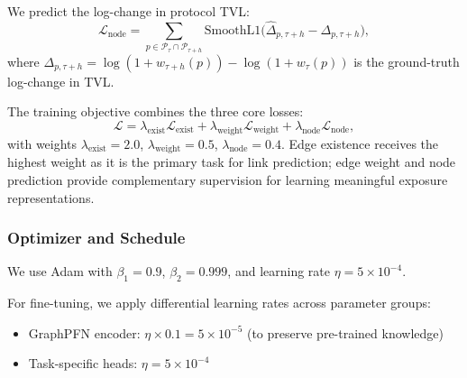 \documentclass[preprint,12pt]{elsarticle}
\renewcommand{\paragraph}[1]{}
\begin{document}
\paragraph{Node prediction loss.}
We predict the log-change in protocol TVL:
\begin{equation}
\mathcal L_{\mathrm{node}} = \sum_{p \in \mathcal P_{\tau} \cap \mathcal P_{\tau+h}} \mathrm{SmoothL1}\bigl(\widehat{\Delta}_{p,\tau+h} - \Delta_{p,\tau+h}\bigr),
\label{eq:loss-node}
\end{equation}
where $\Delta_{p,\tau+h} = \log(1+w_{\tau+h}(p)) - \log(1+w_{\tau}(p))$ is the ground-truth log-change in TVL.

\paragraph{Overall objective.}
The training objective combines the three core losses:
\begin{equation}
\mathcal L = \lambda_{\mathrm{exist}} \mathcal L_{\mathrm{exist}} + \lambda_{\mathrm{weight}} \mathcal L_{\mathrm{weight}} + \lambda_{\mathrm{node}} \mathcal L_{\mathrm{node}},
\label{eq:loss-total}
\end{equation}
with weights $\lambda_{\mathrm{exist}} = 2.0$, $\lambda_{\mathrm{weight}} = 0.5$, $\lambda_{\mathrm{node}} = 0.4$. Edge existence receives the highest weight as it is the primary task for link prediction; edge weight and node prediction provide complementary supervision for learning meaningful exposure representations.

\subsubsection{Optimizer and Schedule}

\paragraph{Optimizer.}
We use Adam with $\beta_1=0.9$, $\beta_2=0.999$, and learning rate $\eta = 5 \times 10^{-4}$.

\paragraph{Differential learning rates.}
For fine-tuning, we apply differential learning rates across parameter groups:
\begin{itemize}
  \item GraphPFN encoder: $\eta \times 0.1 = 5 \times 10^{-5}$ (to preserve pre-trained knowledge)
  \item Task-specific heads: $\eta = 5 \times 10^{-4}$
\end{itemize}
\end{document}
